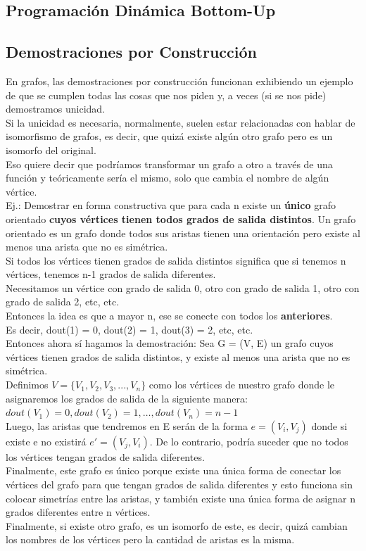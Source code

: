 \documentclass[10pt,a4paper]{article}
\begin{document}
\subsection*{Programación Dinámica Bottom-Up}
\subsection*{Demostraciones por Construcción}
En grafos, las demostraciones por construcción funcionan exhibiendo un ejemplo de que se cumplen todas las cosas que nos piden y, a veces (si se nos pide) demostramos unicidad. \\
Si la unicidad es necesaria, normalmente, suelen estar relacionadas con hablar de isomorfismo de grafos, es decir, que quizá existe algún otro grafo pero es un isomorfo del original. \\
Eso quiere decir que podríamos transformar un grafo a otro a través de una función y teóricamente sería el mismo, solo que cambia el nombre de algún vértice. \\
Ej.: Demostrar en forma constructiva que para cada n existe un \textbf{único} grafo orientado \textbf{cuyos vértices tienen todos grados de salida distintos}. Un grafo orientado es un grafo donde todos sus aristas tienen una orientación pero existe al menos una arista que no es simétrica. \\
Si todos los vértices tienen grados de salida distintos significa que si tenemos n vértices, tenemos n-1 grados de salida diferentes. \\
Necesitamos un vértice con grado de salida 0, otro con grado de salida 1, otro con grado de salida 2, etc, etc. \\
Entonces la idea es que a mayor n, ese se conecte con todos los \textbf{anteriores}. \\
Es decir, dout(1) = 0, dout(2) = 1, dout(3) = 2, etc, etc. \\
Entonces ahora sí hagamos la demostración: Sea G = (V, E) un grafo cuyos vértices tienen grados de salida distintos, y existe al menos una arista que no es simétrica. \\
Definimos $ V = \{V_{1}, V_{2}, V_{3}, ..., V_{n}\}$ como los vértices de nuestro grafo donde le asignaremos los grados de salida de la siguiente manera: $dout(V_{1}) = 0, dout(V_{2}) = 1, \dots, dout(V_{n}) = n-1$ \\
Luego, las aristas que tendremos en E serán de la forma $e = (V_{i}, V_{j})$ donde si existe e no existirá $e' = (V_{j}, V_{i})$. De lo contrario, podría suceder que no todos los vértices tengan grados de salida diferentes. \\
Finalmente, este grafo es único porque existe una única forma de conectar los vértices del grafo para que tengan grados de salida diferentes y esto funciona sin colocar simetrías entre las aristas, y también existe una única forma de asignar n grados diferentes entre n vértices. \\
Finalmente, si existe otro grafo, es un isomorfo de este, es decir, quizá cambian los nombres de los vértices pero la cantidad de aristas es la misma. \\
\end{document}
